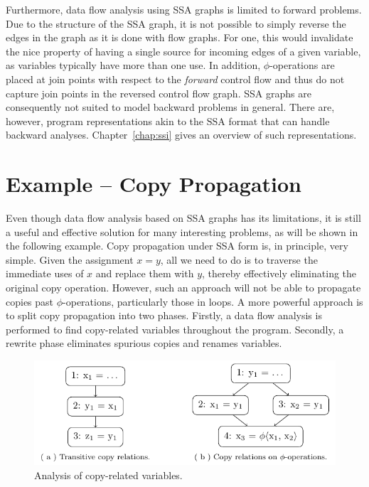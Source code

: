 Furthermore, data flow analysis using SSA graphs is limited to forward problems.
Due to the structure of the SSA graph, it is not possible to simply reverse the
edges in the graph as it is done with flow graphs. For one, this would
invalidate the nice property of having a single source for incoming edges of a
given variable, as variables typically have more than one use. In addition,
$\phi$-operations are placed at join points with respect to the \emph{forward}
control flow and thus do not capture join points in the reversed control flow
graph.
SSA graphs are consequently not suited to model backward problems in general.
There are, however, program representations akin to the SSA format that can
handle backward analyses.
Chapter~\ref{chap:ssi} gives an overview of such representations.

\section{Example -- Copy Propagation}
\label{novillo:sec:example}

Even though data flow analysis based on SSA graphs has its limitations, it is
still a useful and effective solution for many interesting problems, as will be
shown in the following example.
Copy propagation under SSA form is, in principle, very simple.  Given the
assignment $x = y$, all we need to do is to traverse the immediate
uses of $x$ and replace them with $y$, thereby effectively eliminating the
original copy operation. However, such an approach will not be able to propagate
copies past \linebreak $\phi$-operations, particularly those in loops. A more powerful
approach is to split copy propagation into two phases. Firstly, a data flow
analysis is performed to find copy-related variables throughout the program.
Secondly, a rewrite phase eliminates spurious copies and renames variables.

\begin{figure}[t!]
  \begin{center}
    \includegraphics{copy_propagation}
    \subfloat{\label{novillo:fig:copy_propagation:a}}
    \subfloat{\label{novillo:fig:copy_propagation:b}}
  \end{center}
  \vspace{-1em}
  \caption{Analysis of copy-related variables.}
  \label{novillo:fig:copy_propagation}
\end{figure}

